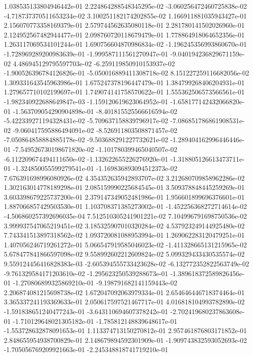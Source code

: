 1.038535133804946442e-01
2.224864288548345295e-02
-3.060256472460725838e-02
-4.718737370511653234e-02
3.100251182174202855e-02
1.166911881035943427e-01
2.156070773358169379e-01
2.579744562635080118e-01
2.281780141502026960e-01
2.124952567482944477e-01
2.098760720118679479e-01
1.778864918064652356e-01
1.263117069534101244e-01
1.690756604870986834e-02
-1.196245356993860670e-01
-1.728969289200983639e-01
-1.999587111561270947e-01
-9.040194236829671159e-02
4.486945129795597703e-02
-6.259119850910153937e-02
-1.900526396784126826e-01
-5.050016889411308718e-02
8.151227259116682056e-02
1.309331643545963986e-01
1.675247378196447479e-01
1.384799268406204931e-01
1.279657710102199697e-01
1.749074141758570622e-01
1.555362506573566561e-01
-1.982340922688649847e-03
-1.159120619623064952e-01
-1.658177142432066820e-01
-1.563709054290904898e-01
-8.401815525566616594e-02
-5.422339271194328431e-02
-5.709637158839796917e-02
-7.086851786861908531e-02
-9.060417595886494091e-02
-8.526911803508871457e-02
-7.050864858884885178e-02
-9.503688291227732621e-02
-1.289404162996446446e-01
-7.549526730198671820e-02
-1.101780399465040507e-02
-6.112209674494111650e-02
-1.132622655226276920e-01
-1.318805126613473711e-01
-1.324850055599279541e-01
-1.169836893094512373e-02
7.676391698996080926e-02
4.354352635942893707e-02
3.212680709858962286e-02
1.302163014778189298e-01
2.085159990225684545e-01
3.509378848445259269e-01
3.603398679225737200e-01
2.379147349052481986e-01
1.956601899696376601e-01
1.887066857429503530e-01
1.103708371385273002e-01
-1.452256368272714614e-02
-4.506860257392696035e-04
7.512510305241901221e-02
7.104996791698750536e-02
3.999937547065219451e-02
3.185325907010320284e-02
4.537923249144925480e-02
7.743341513897318562e-02
1.093720081088953994e-01
1.269062283120479251e-01
1.407056246719261272e-01
5.066547919585046023e-02
-1.411328665131215965e-02
5.678477841866597098e-02
9.558992602212609824e-02
5.099329433430535574e-02
9.559124456416828383e-03
-2.605394555733423628e-02
-6.132772352822563749e-02
-9.761329584171203610e-02
-1.295623250539288673e-01
-1.389618372589826456e-01
-1.270806899325869210e-01
-9.198791682141159443e-02
2.206874081215698738e-02
1.672047092063979334e-01
2.654646446718374464e-01
3.365337241193369633e-01
2.050617597521467717e-01
4.016818104993782890e-02
-1.591838651240477243e-01
-3.643110694607378242e-01
-2.702419680237863608e-01
-1.710129648021305182e-01
-1.785812148839648617e-01
-1.553728632878091653e-01
1.113374713150270812e-01
2.957461876803171852e-01
2.848655954938700829e-01
2.148679894592301909e-01
-1.909743832593052693e-02
-1.705056769209921663e-01
-2.245348818741719210e-01
